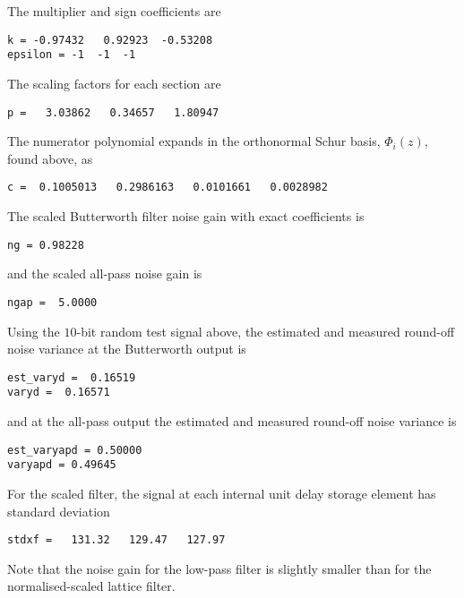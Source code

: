 \documentclass[a4paper,twoside,10pt,english]{report}
\begin{document}
The multiplier and sign coefficients are
\begin{small}
\begin{verbatim}
k = -0.97432   0.92923  -0.53208
epsilon = -1  -1  -1
\end{verbatim}
\end{small}
The scaling factors for each section are
\begin{small}
\begin{verbatim}
p =   3.03862   0.34657   1.80947
\end{verbatim}
\end{small}
The numerator polynomial expands in the orthonormal Schur basis, 
$\Phi_{i}\left(z\right)$, found above, as
\begin{small}
\begin{verbatim}
c =  0.1005013   0.2986163   0.0101661   0.0028982
\end{verbatim}
\end{small}
The scaled Butterworth filter noise gain with exact coefficients is
\begin{small}
\begin{verbatim}
ng = 0.98228
\end{verbatim}
\end{small}
and the scaled all-pass noise gain is
\begin{small}
\begin{verbatim}
ngap =  5.0000
\end{verbatim}
\end{small}
Using the $10$-bit random test signal above, the estimated and measured 
round-off noise variance at the Butterworth output is
\begin{small}
\begin{verbatim}
est_varyd =  0.16519
varyd =  0.16571
\end{verbatim}
\end{small}
and at the all-pass output the estimated and measured round-off noise variance is
\begin{small}
\begin{verbatim}
est_varyapd = 0.50000
varyapd = 0.49645
\end{verbatim}
\end{small}
For the scaled filter, the signal at each internal unit delay storage
element has standard deviation 
\begin{small}
\begin{verbatim}
stdxf =   131.32   129.47   127.97
\end{verbatim}
\end{small}
Note that the noise gain for the low-pass filter is slightly smaller than
for the normalised-scaled lattice filter. 
\end{document}

